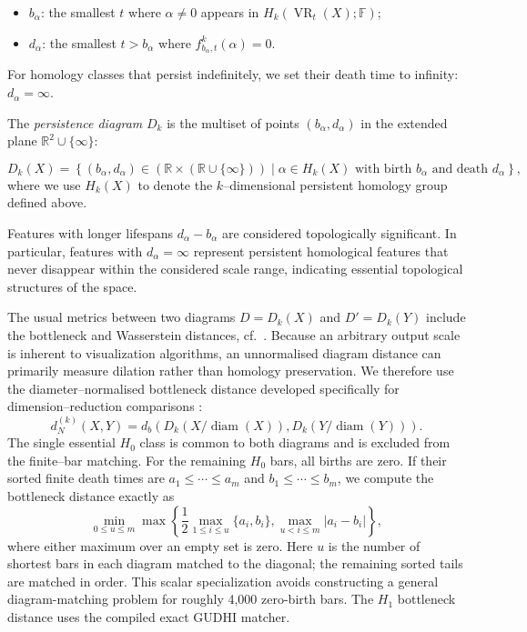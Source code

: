 \documentclass[11pt]{article}
\begin{document}
\begin{itemize}
    \item \(b_\alpha\): the smallest \(t\) where \(\alpha \neq 0\) appears in \(H_k\left( \operatorname{VR}_{t}(X); \mathbb{F} \right)\);

    \item \(d_\alpha\): the smallest \(t > b_\alpha\) where \(f_{b_\alpha, t}^k(\alpha) = 0\).
\end{itemize}

For homology classes that persist indefinitely, we set their death time to infinity: \(d_\alpha = \infty\).

The \textit{persistence diagram} \(D_k\) is the multiset of points \((b_\alpha, d_\alpha)\) in the extended plane \(\mathbb{R}^2 \cup \{\infty\}\):

\[
D_k(X) = \left\{ (b_\alpha, d_\alpha) \in (\mathbb{R} \times (\mathbb{R} \cup \{\infty\})) \mid \alpha \in H_k(X) \text{ with birth } b_\alpha \text{ and death } d_\alpha \right\},
\]
where we use $H_k(X)$ to denote the $k$--dimensional persistent homology group defined above.

Features with longer lifespans \(d_\alpha - b_\alpha\) are considered topologically significant. In particular, features with \(d_\alpha = \infty\) represent persistent homological features that never disappear within the considered scale range, indicating essential topological structures of the space.

The usual metrics between two diagrams $D = D_k(X)$ and $D' = D_k(Y)$
include the bottleneck and Wasserstein distances, cf.\
\cite{persim-docs}. Because an arbitrary output scale is inherent to
visualization algorithms, an unnormalised diagram distance can primarily
measure dilation rather than homology preservation. We therefore use the
diameter--normalised bottleneck distance developed specifically for
dimension--reduction comparisons \cite{may-normalized-bottleneck-2024}:
\[
d_N^{(k)}(X,Y)
=
d_b\!\left(
D_k\!\left(X/\operatorname{diam}(X)\right),
D_k\!\left(Y/\operatorname{diam}(Y)\right)
\right).
\]
The single essential $H_0$ class is common to both diagrams and is excluded
from the finite--bar matching.
For the remaining $H_0$ bars, all births are zero. If their sorted finite death
times are $a_1\leq\cdots\leq a_m$ and
$b_1\leq\cdots\leq b_m$, we compute the bottleneck distance exactly as
\[
\min_{0\leq u\leq m}
\max\!\left\{
  \frac{1}{2}\max_{1\leq i\leq u}\{a_i,b_i\},
  \max_{u<i\leq m}|a_i-b_i|
\right\},
\]
where either maximum over an empty set is zero. Here $u$ is the number of
shortest bars in each diagram matched to the diagonal; the remaining sorted
tails are matched in order. This scalar specialization avoids constructing a
general diagram-matching problem for roughly 4,000 zero-birth bars. The
$H_1$ bottleneck distance uses the compiled exact GUDHI matcher.
\end{document}
